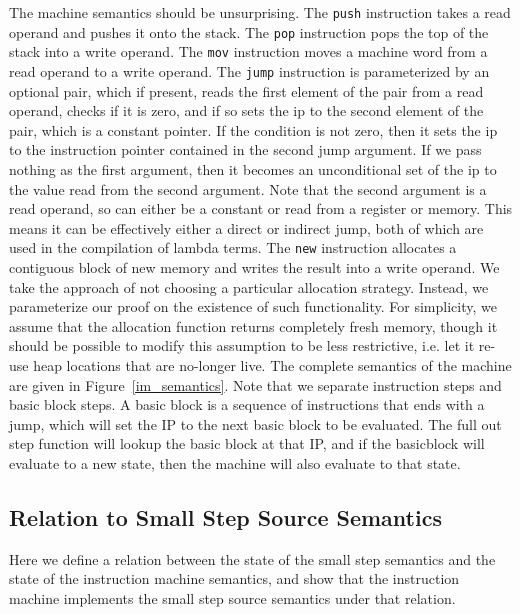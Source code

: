 The machine semantics should be unsurprising. The \texttt{push} instruction
takes a read operand and pushes it onto the stack. The \texttt{pop} instruction
pops the top of the stack into a write operand. The \texttt{mov} instruction
moves a machine word from a read operand to a write operand. The \texttt{jump}
instruction is parameterized by an optional pair, which if present, reads 
the first element of the pair from a read operand, checks if it is zero, and if
so sets the ip to the second element of the pair, which is a constant pointer. If the
condition is not zero, then it sets the ip to the instruction pointer contained
in the second jump argument. If we pass nothing as the first argument, then it
becomes an unconditional set of the ip to the value read from the second argument.
Note that the second argument is a read operand, so can either be a constant or
read from a register or memory. This means it can be effectively either a direct
or indirect jump, both of which are used in the compilation of lambda terms. The
\texttt{new} instruction allocates a contiguous block of new memory and writes
the result into a write operand. We take the approach of not choosing a
particular allocation strategy. Instead, we parameterize our proof on the
existence of such functionality. For simplicity, we assume that the allocation
function returns completely fresh memory, though it should be possible to modify
this assumption to be less restrictive, i.e. let it re-use heap locations that
are no-longer live. The complete semantics of the machine are given in
Figure~\ref{im_semantics}. Note that we separate instruction steps and basic
block steps. A basic block is a sequence of instructions that ends with a jump,
which will set the IP to the next basic block to be evaluated. The full out step
function will lookup the basic block at that IP, and if the basicblock will
evaluate to a new state, then the machine will also evaluate to that state. 

\subsection{Relation to Small Step Source Semantics}

Here we define a relation between the state of the small step semantics and the
state of the instruction machine semantics, and show that the instruction
machine implements the small step source semantics under that relation. 

